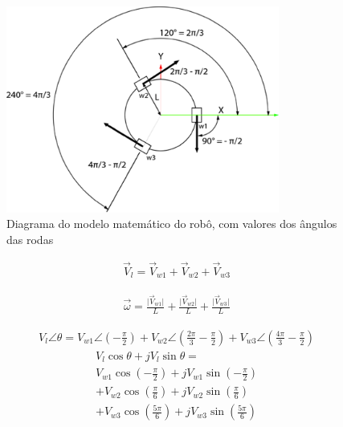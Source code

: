 \begin{figure}[ht]
	\centering
	\caption{Diagrama do modelo matemático do robô, com valores dos ângulos das
	rodas}
	\includegraphics[width=0.8\textwidth]{figures/digram_model_dedution}
\end{figure}

\begin{equation}
    \begin{split}
        \overrightarrow{V}_{l} = 
        \overrightarrow{V}_{w1}
        + \overrightarrow{V}_{w2}
        + \overrightarrow{V}_{w3}
    \end{split}
\end{equation}

\begin{equation}
    \begin{split}
        \overrightarrow{\omega} = 
        \frac{\vert\overrightarrow{V}_{w1}\vert}{L}
        + \frac{\vert\overrightarrow{V}_{w2}\vert}{L}
        + \frac{\vert\overrightarrow{V}_{w3}\vert}{L}
    \end{split}
\end{equation}

\begin{gather*}
        V_{l} \angle \theta =  
        V_{w1} \angle \left(-\frac{\pi}{2}\right) 
        + V_{w2} \angle \left(\frac{2\pi}{3}-\frac{\pi}{2}\right) 
        + V_{w3} \angle \left(\frac{4\pi}{3}-\frac{\pi}{2}\right) 
\end{gather*}
\begin{gather*}
    V_{l} \cos{ \theta } + jV_{l} \sin{\theta} =  \\
    V_{w1} \cos{ \left(-\frac{\pi}{2}\right)} + jV_{w1} \sin{ \left(-\frac{\pi}{2}\right) } \\
    + V_{w2}  \cos{ \left(\frac{\pi}{6}\right) } + jV_{w2}  \sin{ \left(\frac{\pi}{6}\right) }  \\
    + V_{w3} \cos{ \left(\frac{5\pi}{6}\right) } + jV_{w3}  \sin{ \left(\frac{5\pi}{6}\right) } 
\end{gather*}

